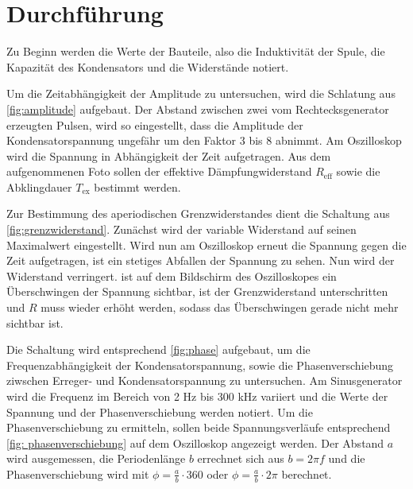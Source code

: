 \section{Durchführung}
\label{sec:durchführung}

Zu Beginn werden die Werte der Bauteile, also die Induktivität der Spule, die Kapazität des Kondensators und die Widerstände notiert.


Um die Zeitabhängigkeit der Amplitude zu untersuchen, wird die Schlatung aus \ref{fig:amplitude} aufgebaut. Der Abstand zwischen zwei vom Rechtecksgenerator erzeugten Pulsen, wird so eingestellt, dass die Amplitude der Kondensatorspannung ungefähr um den Faktor 3 bis 8 abnimmt. Am Oszilloskop wird die Spannung in Abhängigkeit der Zeit aufgetragen. Aus dem aufgenommenen Foto sollen der effektive Dämpfungwiderstand $R_\mathrm{eff}$ sowie die Abklingdauer $T_\mathrm{ex}$ bestimmt werden.


Zur Bestimmung des aperiodischen Grenzwiderstandes dient die Schaltung aus \ref{fig:grenzwiderstand}. Zunächst wird der variable Widerstand auf seinen Maximalwert eingestellt. Wird nun am Oszilloskop erneut die Spannung gegen die Zeit aufgetragen, ist ein stetiges Abfallen der Spannung zu sehen. Nun wird der Widerstand verringert. ist auf dem Bildschirm des Oszilloskopes ein Überschwingen der Spannung sichtbar, ist der Grenzwiderstand unterschritten und $R$ muss wieder erhöht werden, sodass das Überschwingen gerade nicht mehr sichtbar ist.


Die Schaltung wird entsprechend \ref{fig:phase} aufgebaut, um die Frequenzabhängigkeit der Kondensatorspannung, sowie die Phasenverschiebung ziwschen Erreger- und Kondensatorspannung zu untersuchen. Am Sinusgenerator wird die Frequenz im Bereich von 2 \si{\Hz} bis 300 \si{\kilo\Hz} variiert und die Werte der Spannung und der Phasenverschiebung werden notiert. Um die Phasenverschiebung zu ermitteln, sollen beide Spannungsverläufe entsprechend \ref{fig: phasenverschiebung} auf dem Oszilloskop angezeigt werden. Der Abstand $a$ wird ausgemessen, die Periodenlänge $b$ errechnet sich aus $b = 2\pi f$ und die Phasenverschiebung wird mit $\phi = \frac{a}{b} \cdot 360$ oder $\phi = \frac{a}{b} \cdot 2\pi $ berechnet.

